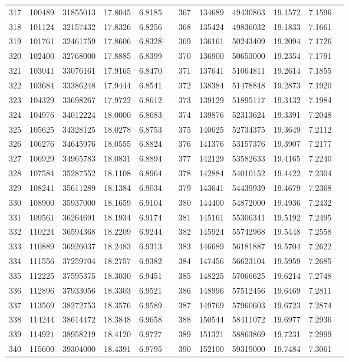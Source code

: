 \begin{longtable}{SSSSSSSSSSSS}
317&100489&31855013&17.8045&6.8185&&367&134689&49430863&19.1572&7.1596\\
318&101124&32157432&17.8326&6.8256&&368&135424&49836032&19.1833&7.1661\\
319&101761&32461759&17.8606&6.8328&&369&136161&50243409&19.2094&7.1726\\
320&102400&32768000&17.8885&6.8399&&370&136900&50653000&19.2354&7.1791\\
321&103041&33076161&17.9165&6.8470&&371&137641&51064811&19.2614&7.1855\\
322&103684&33386248&17.9444&6.8541&&372&138384&51478848&19.2873&7.1920\\
323&104329&33698267&17.9722&6.8612&&373&139129&51895117&19.3132&7.1984\\
324&104976&34012224&18.0000&6.8683&&374&139876&52313624&19.3391&7.2048\\
325&105625&34328125&18.0278&6.8753&&375&140625&52734375&19.3649&7.2112\\
326&106276&34645976&18.0555&6.8824&&376&141376&53157376&19.3907&7.2177\\
327&106929&34965783&18.0831&6.8894&&377&142129&53582633&19.4165&7.2240\\
328&107584&35287552&18.1108&6.8964&&378&142884&54010152&19.4422&7.2304\\
329&108241&35611289&18.1384&6.9034&&379&143641&54439939&19.4679&7.2368\\
330&108900&35937000&18.1659&6.9104&&380&144400&54872000&19.4936&7.2432\\
331&109561&36264691&18.1934&6.9174&&381&145161&55306341&19.5192&7.2495\\
332&110224&36594368&18.2209&6.9244&&382&145924&55742968&19.5448&7.2558\\
333&110889&36926037&18.2483&6.9313&&383&146689&56181887&19.5704&7.2622\\
334&111556&37259704&18.2757&6.9382&&384&147456&56623104&19.5959&7.2685\\
335&112225&37595375&18.3030&6.9451&&385&148225&57066625&19.6214&7.2748\\
336&112896&37933056&18.3303&6.9521&&386&148996&57512456&19.6469&7.2811\\
337&113569&38272753&18.3576&6.9589&&387&149769&57960603&19.6723&7.2874\\
338&114244&38614472&18.3848&6.9658&&388&150544&58411072&19.6977&7.2936\\
339&114921&38958219&18.4120&6.9727&&389&151321&58863869&19.7231&7.2999\\
340&115600&39304000&18.4391&6.9795&&390&152100&59319000&19.7484&7.3061\\

\end{longtable}
